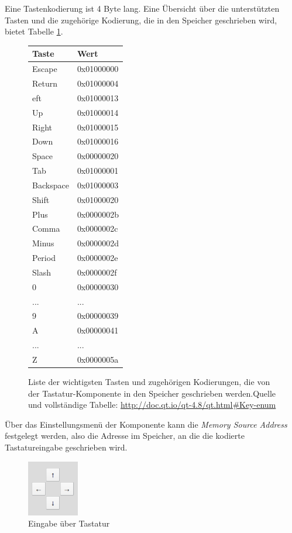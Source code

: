 Eine Tastenkodierung ist 4 Byte lang. Eine Übersicht über die unterstützten
Tasten und die zugehörige Kodierung, die in den Speicher geschrieben wird, bietet
Tabelle \ref{tab:keys}.

\begin{figure}
	\centering
	\begin{tabular}{ll}
	\textbf{Taste} & \textbf{Wert} \\
	\hline
	Escape & 0x01000000 \\
	Return & 0x01000004 \\
	eft & 0x01000013 \\
	Up & 0x01000014 \\
	Right & 0x01000015 \\
	Down & 0x01000016 \\
	Space & 0x00000020 \\
	Tab & 0x01000001 \\
	Backspace & 0x01000003 \\
	Shift & 0x01000020 \\
	Plus & 0x0000002b \\
	Comma & 0x0000002c \\
	Minus & 0x0000002d \\
	Period & 0x0000002e \\
	Slash & 0x0000002f \\
	0 & 0x00000030 \\
	... & ... \\
	9 & 0x00000039 \\
	A & 0x00000041 \\
	... & ... \\
	Z & 0x0000005a \\
\end{tabular}
	\caption{Liste der wichtigsten Tasten und zugehörigen Kodierungen, die von der
	Tastatur-Komponente in den Speicher geschrieben werden.\newline Quelle und
	vollständige Tabelle:
	\url{http://doc.qt.io/qt-4.8/qt.html\#Key-enum}}
	\label{tab:keys}
\end{figure}

Über das Einstellungsmenü der Komponente kann die \textit{Memory Source Address}
festgelegt werden, also die Adresse im Speicher, an die die kodierte
Tastatureingabe geschrieben wird.

\begin{figure}[ht]
	\centering
	\includegraphics[width=0.2\textwidth]{Images/Joystick}
	\caption{Eingabe über Tastatur}
	\label{Joystick}
\end{figure}


